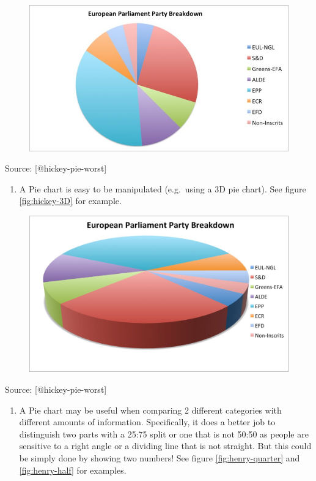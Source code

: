 \documentclass[]{book}
\providecommand{\tightlist}{%
  \setlength{\itemsep}{0pt}\setlength{\parskip}{0pt}}
\theoremstyle{definition}
\theoremstyle{definition}
\theoremstyle{definition}
\theoremstyle{remark}
\begin{document}
\begin{figure}
\centering
\includegraphics{images/hickey-breakdown.jpg}
\caption{}
\end{figure}

Source: {[}@hickey-pie-worst{]}

\begin{enumerate}
\def\labelenumi{\arabic{enumi}.}
\setcounter{enumi}{2}
\tightlist
\item
  A Pie chart is easy to be manipulated (e.g.~using a 3D pie chart). See
  figure \ref{fig:hickey-3D} for example.
\end{enumerate}

\begin{figure}
\centering
\includegraphics{images/hickey-3D.jpg}
\caption{}
\end{figure}

Source: {[}@hickey-pie-worst{]}

\begin{enumerate}
\def\labelenumi{\arabic{enumi}.}
\setcounter{enumi}{3}
\tightlist
\item
  A Pie chart may be useful when comparing 2 different categories with
  different amounts of information. Specifically, it does a better job
  to distinguish two parts with a 25:75 split or one that is not 50:50
  as people are sensitive to a right angle or a dividing line that is
  not straight. But this could be simply done by showing two numbers!
  See figure \ref{fig:henry-quarter} and \ref{fig:henry-half} for
  examples.
\end{enumerate}
\end{document}
